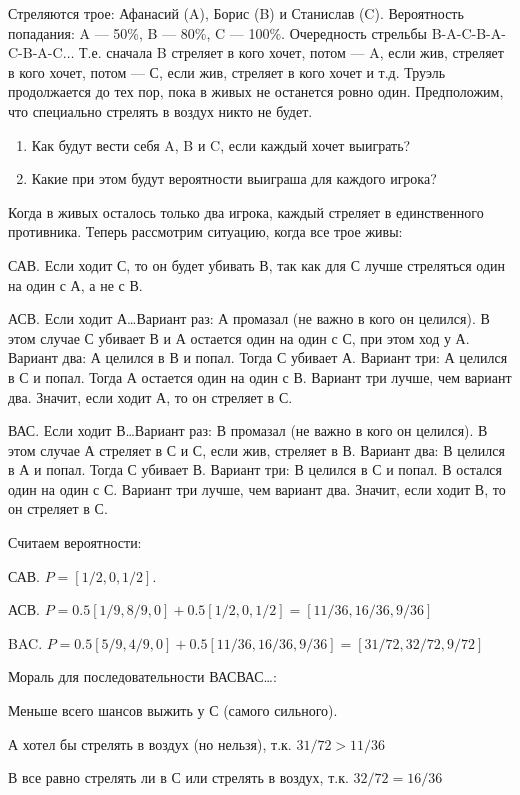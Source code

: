 \begin{problem}
Стреляются трое: Афанасий (A), Борис (B) и Станислав (C). Вероятность попадания: A --- 50\%, B --- 80\%, C --- 100\%. Очередность стрельбы B-A-C-B-A-C-B-A-C$\ldots$ Т.е. сначала B стреляет в кого хочет, потом --- A, если жив, стреляет в кого хочет, потом --- С, если жив, стреляет в кого хочет и т.д. Труэль продолжается до тех пор, пока в живых не останется ровно один. Предположим, что специально стрелять в воздух никто не будет.

\begin{enumerate}
\item Как будут вести себя A, B и C, если каждый хочет выиграть?

\item Какие при этом будут вероятности выиграша для каждого игрока?
\end{enumerate}
\begin{sol}
Когда в живых осталось только два игрока, каждый стреляет в единственного противника. Теперь рассмотрим ситуацию, когда все трое живы:

САВ. Если ходит С, то он будет убивать В, так как для С лучше стреляться один на один с А, а не с В.

АСВ. Если ходит А\ldots Вариант раз: А промазал (не важно в кого он целился). В этом случае С убивает В и А остается один на один с С, при этом ход у А.  Вариант два: А целился в В и попал. Тогда С убивает А. Вариант три: А целился в С и попал. Тогда А остается один на один с В. Вариант три лучше, чем вариант два. Значит, если ходит А, то он стреляет в С.

ВАС. Если ходит В\ldots Вариант раз: В промазал (не важно в кого он целился). В этом случае А стреляет в С и С, если жив, стреляет в В. Вариант два: В целился в А и попал. Тогда С убивает В. Вариант три: В целился в С и попал. В остался один на один с С. Вариант три лучше, чем вариант два. Значит, если ходит В, то он стреляет в С.

Считаем вероятности:

САВ. $P=[1/2,0,1/2]$.

АСВ. $P=0.5[1/9,8/9,0]+0.5[1/2,0,1/2]=[11/36,16/36,9/36]$

BAC. $P=0.5[5/9,4/9,0]+0.5[11/36,16/36,9/36]=[31/72,32/72,9/72]$

Мораль для последовательности ВАСВАС\ldots :

Меньше всего шансов выжить у С (самого сильного).

А хотел бы стрелять в воздух (но нельзя), т.к. $31/72>11/36$

В все равно стрелять ли в С или стрелять в воздух, т.к. $32/72=16/36$
\end{sol}
\end{problem}






